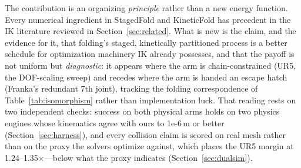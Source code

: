 \documentclass[10pt,conference]{IEEEtran}
\begin{document}
The contribution is an organizing \emph{principle} rather than a new energy
function. Every numerical ingredient in StagedFold and KineticFold has precedent
in the IK literature reviewed in Section~\ref{sec:related}. What is new is the
claim, and the evidence for it, that folding's staged, kinetically partitioned
process is a better schedule for optimization machinery IK already possesses, and
that the payoff is not uniform but \emph{diagnostic}: it appears where the arm is
chain-constrained (UR5, the DOF-scaling sweep) and recedes where the arm is
handed an escape hatch (Franka's redundant 7th joint), tracking the folding
correspondence of Table~\ref{tab:isomorphism} rather than implementation luck.
That reading rests on two independent checks: success on both physical arms holds
on two physics engines whose kinematics agree with ours to 1e-6\,m or better
(Section~\ref{sec:harness}), and every collision claim is scored on real mesh
rather than on the proxy the solvers optimize against, which places the UR5
margin at 1.24--1.35$\times$---below what the proxy indicates
(Section~\ref{sec:dualsim}).
\end{document}
